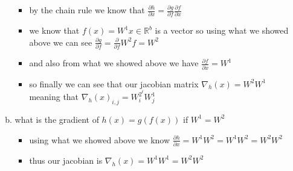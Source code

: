 \documentclass{article}
\begin{document}
\begin{enumerate}[(a)]
\begin{enumerate}[(a)]
\begin{itemize}
    \color{blue}
    \item  by the chain rule we know that $\frac{\partial h}{\partial x}= \frac{\partial g}{\partial f}\frac{\partial f}{\partial x}$
    \item we know that $f(x)=W^1x\in \mathbb{R}^{b}$ is a vector so using what we showed above we can see  $\frac{\partial g}{\partial f}=\frac{\partial}{\partial f}W^{2}f=W^2$
    \item and also from what we showed above we have $\frac{\partial f}{\partial x}=W^1$
    \item so finally we can see that our jacobian matrix $\nabla_{h}(x)=W^2W^1$ meaning that $\nabla_h(x)_{i,j}=W^{2^t}_{i}W^{1}_j $
\end{itemize}
\item what is the gradient of $h(x)=g(f(x))$ if $W^1=W^2$
\begin{itemize}
\color{blue}
\item using what we showed above we know $\frac{\partial h}{\partial x} = W^1W^2=W^1W^2=W^2W^2$
\item thus our jacobian is $\nabla_h(x)=W^1W^1=W^2W^2$
\end{itemize}   
\end{enumerate}
    \end{enumerate}
\end{document}
